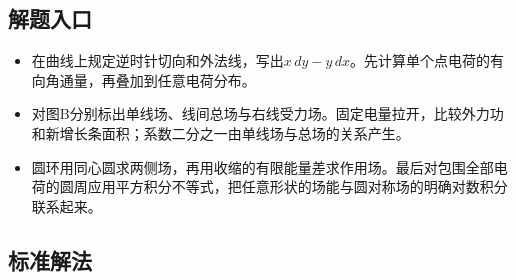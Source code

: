 \documentclass[UTF8,fontset=fandol,a4paper,11pt]{ctexart}
\begin{document}
\subsection*{解题入口}

\begin{itemize}
\item 在曲线上规定逆时针切向和外法线，写出$x\,dy-y\,dx$。先计算单个点电荷的有向角通量，再叠加到任意电荷分布。
\item 对图B分别标出单线场、线间总场与右线受力场。固定电量拉开，比较外力功和新增长条面积；系数二分之一由单线场与总场的关系产生。
\item 圆环用同心圆求两侧场，再用收缩的有限能量差求作用场。最后对包围全部电荷的圆周应用平方积分不等式，把任意形状的场能与圆对称场的明确对数积分联系起来。
\end{itemize}



\subsection*{标准解法}
\end{document}
